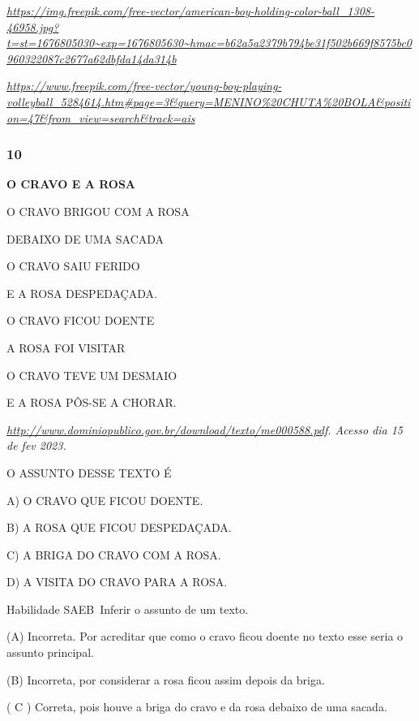 \href{https://img.freepik.com/free-vector/american-boy-holding-color-ball_1308-46958.jpg?t=st=1676805030~exp=1676805630~hmac=b62a5a2379b794be31f502b669f8575bc0960322087c2677a62dbfda14da314b}{\emph{https://img.freepik.com/free-vector/american-boy-holding-color-ball\_1308-46958.jpg?t=st=1676805030\textasciitilde{}exp=1676805630\textasciitilde{}hmac=b62a5a2379b794be31f502b669f8575bc0960322087c2677a62dbfda14da314b}}

\href{https://www.freepik.com/free-vector/young-boy-playing-volleyball_5284614.htm\#page=3\&query=MENINO\%20CHUTA\%20BOLA\&position=47\&from_view=search\&track=ais}{\emph{https://www.freepik.com/free-vector/young-boy-playing-volleyball\_5284614.htm\#page=3\&query=MENINO\%20CHUTA\%20BOLA\&position=47\&from\_view=search\&track=ais}}

\subsubsection{10}\label{section-35}

\textbf{O CRAVO E A ROSA}

O CRAVO BRIGOU COM A ROSA

DEBAIXO DE UMA SACADA

O CRAVO SAIU FERIDO

E A ROSA DESPEDAÇADA.

O CRAVO FICOU DOENTE

A ROSA FOI VISITAR

O CRAVO TEVE UM DESMAIO

E A ROSA PÔS-SE A CHORAR.

\emph{\url{http://www.dominiopublico.gov.br/download/texto/me000588.pdf}.
Acesso dia 15 de fev 2023.}

O ASSUNTO DESSE TEXTO É

A) O CRAVO QUE FICOU DOENTE.

B) A ROSA QUE FICOU DESPEDAÇADA.

C) A BRIGA DO CRAVO COM A ROSA.

D) A VISITA DO CRAVO PARA A ROSA.

Habilidade SAEB~Inferir o assunto de um texto.

\protect\hypertarget{_heading=h.4f1mdlm}{}{}(A) Incorreta. Por acreditar
que como o cravo ficou doente no texto esse seria o assunto principal.

(B) Incorreta, por considerar a rosa ficou assim depois da briga.

( C ) Correta, pois houve a briga do cravo e da rosa debaixo de uma
sacada.

